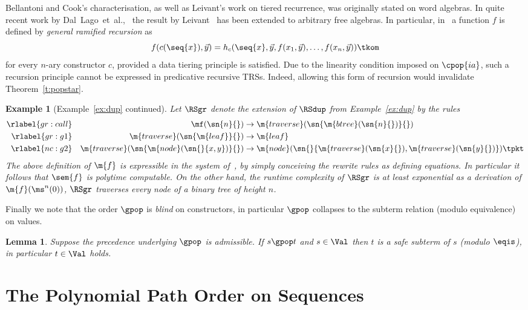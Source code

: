 \documentclass{LMCS}
\newtheorem{example}[thm]{Example}
\newtheorem{lemma}[thm]{Lemma}
\begin{document}
Bellantoni and Cook's characterisation, as well as Leivant's work on tiered recurrence,
was originally stated on word algebras. In quite recent work 
by Dal~Lago~et~al.,~\cite{DLMZ:10} the result by Leivant~\cite{Leivant:1990,Leivant93} has been extended to arbitrary free algebras. 
In particular, in~\cite{DLMZ:10} a function $f$ is defined by \emph{general ramified recursion} as 
$$
  f(c(\seq{x}), \vec{y}) = h_c(\seq{x},\vec{y},f(x_1,\vec{y}),\dots,f(x_n,\vec{y})) \tkom
$$
for every $n$-ary constructor $c$, provided a data tiering principle is satisfied.
Due to the linearity condition imposed on $\cpop{ia}$, such a recursion principle 
cannot be expressed in predicative recursive TRSs. Indeed, allowing this form 
of recursion would invalidate Theorem~\ref{t:popstar}. 
\begin{example}[Example~\ref{ex:dup} continued]
  Let $\RSgr$ denote the extension of $\RSdup$ from Example~\ref{ex:dup} by the rules
  \begin{alignat*}{4}
    \rlabel{gr:call}  && \mf(\sn{n}{}) & \to \m{traverse}(\sn{\m{btree}(\sn{n}{})}{})
    \\
    \rlabel{gr:g1}  && \m{traverse}(\sn{\m{leaf}}{}) & \to \m{leaf}
    \\
    \rlabel{nc:g2}  && \m{traverse}(\sn{\m{node}(\sn{}{x,y})}{}) & \to \m{node}(\sn{}{\m{traverse}(\sn{x}{}), \m{traverse}(\sn{y}{})})
    \tpkt
  \end{alignat*}
  The above definition of $\m{f}$ is expressible in the system of~\cite{DLMZ:10}, 
  by simply conceiving the rewrite rules as defining equations.
  In particular it follows that $\sem{f}$ is polytime computable. 
  On the other hand, the runtime complexity of $\RSgr$ is at least exponential
  as a derivation of $\m{f}(\ms^{n}(0))$, $\RSgr$ traverses every node of a binary tree of height $n$. 
\end{example}


Finally we note that the order $\gpop$ is \emph{blind} on constructors, in particular $\gpop$ collapses 
to the subterm relation (modulo equivalence) on values. 
\begin{lemma}\label{l:gpop:val}
  Suppose the precedence underlying $\gpop$ is admissible.
  If $s \gpop t$ and $s \in \Val$ then $t$ is a safe subterm of $s$ 
  (modulo $\eqis$), in particular $t \in \Val$ holds.
\end{lemma}



\section{The Polynomial Path Order on Sequences}\label{s:pop}
\end{document}
